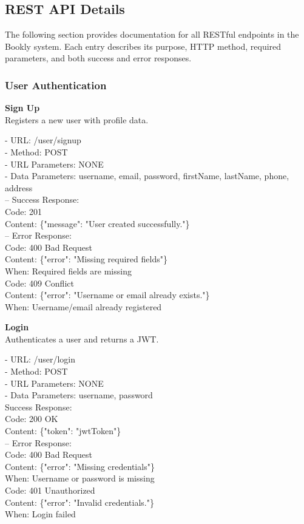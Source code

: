 \subsection*{REST API Details}

The following section provides documentation for all RESTful endpoints in the Bookly system. Each entry describes its purpose, HTTP method, required parameters, and both success and error responses.

\subsubsection*{User Authentication}

\begin{flushleft}
\textbf{Sign Up} \\
Registers a new user with profile data.

- URL: /user/signup \\
- Method: POST \\
- URL Parameters: NONE \\
- Data Parameters: username, email, password, firstName, lastName, phone, address \\
– Success Response: \\
Code: 201 \\
Content: \{"message": "User created successfully."\} \\
– Error Response: \\
Code: 400 Bad Request \\
Content: \{"error": "Missing required fields"\} \\
When: Required fields are missing \\
Code: 409 Conflict \\
Content: \{"error": "Username or email already exists."\} \\
When: Username/email already registered
\end{flushleft}

\begin{flushleft}
\textbf{Login} \\
Authenticates a user and returns a JWT.

- URL: /user/login \\
- Method: POST \\
- URL Parameters: NONE \\
- Data Parameters: username, password \\
Success Response: \\
Code: 200 OK \\
Content: \{"token": "jwtToken"\} \\
– Error Response: \\
Code: 400 Bad Request \\
Content: \{"error": "Missing credentials"\} \\
When: Username or password is missing \\
Code: 401 Unauthorized \\
Content: \{"error": "Invalid credentials."\} \\
When: Login failed
\end{flushleft}

